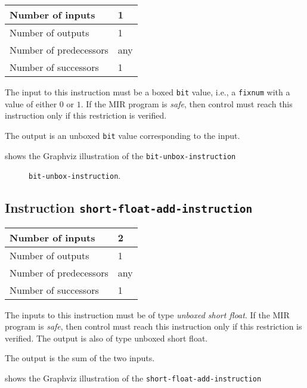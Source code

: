 \begin{tabular}{|l|l|}
\hline
Number of inputs & 1\\
\hline
Number of outputs & 1\\
\hline
Number of predecessors & any\\
\hline
Number of successors & 1\\
\hline
\end{tabular}

The input to this instruction must be a boxed \texttt{bit} value,
i.e., a \texttt{fixnum} with a value of either $0$ or $1$.  If the MIR
program is \emph{safe}, then control must reach this instruction only
if this restriction is verified.

The output is an unboxed \texttt{bit} value corresponding to
the input.

 shows the Graphviz illustration of the
\texttt{bit-unbox-instruction}

\begin{figure}
\begin{center}
\end{center}
\caption{\label{fig-bit-unbox-instruction}
\texttt{bit-unbox-instruction}.}
\end{figure}

\subsection{Instruction \texttt{short-float-add-instruction}}
\label{mir-instruction-short-float-add}

\begin{tabular}{|l|l|}
\hline
Number of inputs & 2\\
\hline
Number of outputs & 1\\
\hline
Number of predecessors & any\\
\hline
Number of successors & 1\\
\hline
\end{tabular}

The inputs to this instruction must be of type \emph{unboxed short
  float}.  If the MIR program is \emph{safe}, then control must reach
this instruction only if this restriction is verified.  The output is
also of type unboxed short float.

The output is the sum of the two inputs.

 shows the Graphviz illustration of the
\texttt{short-float-add-instruction}

